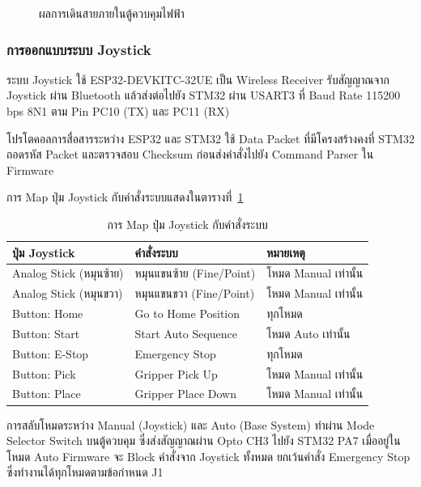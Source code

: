 \begin{figure}[H]
  \centering
  \caption{ผลการเดินสายภายในตู้ควบคุมไฟฟ้า}
  \label{fig:cabinet_wiring}
\end{figure}

\subsubsection{การออกแบบระบบ Joystick}
\label{subsubsec:joystick_system_design}

ระบบ Joystick ใช้ ESP32-DEVKITC-32UE เป็น Wireless Receiver
รับสัญญาณจาก Joystick ผ่าน Bluetooth แล้วส่งต่อไปยัง STM32
ผ่าน USART3 ที่ Baud Rate 115200\,bps 8N1
ตาม Pin PC10 (TX) และ PC11 (RX)

โปรโตคอลการสื่อสารระหว่าง ESP32 และ STM32
ใช้ Data Packet ที่มีโครงสร้างคงที่
STM32 ถอดรหัส Packet และตรวจสอบ Checksum
ก่อนส่งคำสั่งไปยัง Command Parser ใน Firmware

การ Map ปุ่ม Joystick กับคำสั่งระบบแสดงในตารางที่~\ref{tab:joystick_map}

\begin{table}[H]
  \centering
  \caption{การ Map ปุ่ม Joystick กับคำสั่งระบบ}
  \label{tab:joystick_map}
  \begin{tabular}{lll}
    \toprule
    ปุ่ม Joystick & คำสั่งระบบ & หมายเหตุ \\
    \midrule
    Analog Stick (หมุนซ้าย)  & หมุนแขนซ้าย (Fine/Point) & โหมด Manual เท่านั้น \\
    Analog Stick (หมุนขวา)  & หมุนแขนขวา (Fine/Point) & โหมด Manual เท่านั้น \\
    Button: Home            & Go to Home Position      & ทุกโหมด \\
    Button: Start           & Start Auto Sequence      & โหมด Auto เท่านั้น \\
    Button: E-Stop          & Emergency Stop           & ทุกโหมด \\
    Button: Pick            & Gripper Pick Up          & โหมด Manual เท่านั้น \\
    Button: Place           & Gripper Place Down       & โหมด Manual เท่านั้น \\
    \bottomrule
  \end{tabular}
\end{table}

การสลับโหมดระหว่าง Manual (Joystick) และ Auto (Base System)
ทำผ่าน Mode Selector Switch บนตู้ควบคุม
ซึ่งส่งสัญญาณผ่าน Opto CH3 ไปยัง STM32 PA7
เมื่ออยู่ในโหมด Auto Firmware จะ Block คำสั่งจาก Joystick ทั้งหมด
ยกเว้นคำสั่ง Emergency Stop ซึ่งทำงานได้ทุกโหมดตามข้อกำหนด J1

